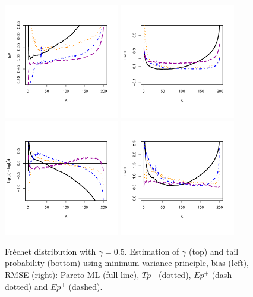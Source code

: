  \begin{figure}[!ht]
 \centering
 \includegraphics[width=0.45\textwidth]{./plots/paper3/frechetPareto_evi.pdf} 
\includegraphics[width=0.45\textwidth]{./plots/paper3/frechetPareto_rmse.pdf} \\
\includegraphics[width=0.45\textwidth]{./plots/paper3/frechetPareto_tail.pdf}
\includegraphics[width=0.45\textwidth]{./plots/paper3/frechetPareto_tail_rmse.pdf} 
\caption{Fr\'echet distribution with $\gamma=0.5$. Estimation of $\gamma$ (top) and tail probability (bottom) using minimum variance principle, bias (left), RMSE (right): Pareto-ML (full line), $T\bar{p}^+$ (dotted), $Ep^+$ (dash-dotted) and $E\bar{p}^+$ (dashed).}
\label{paper3:fig5}
 \end{figure}
